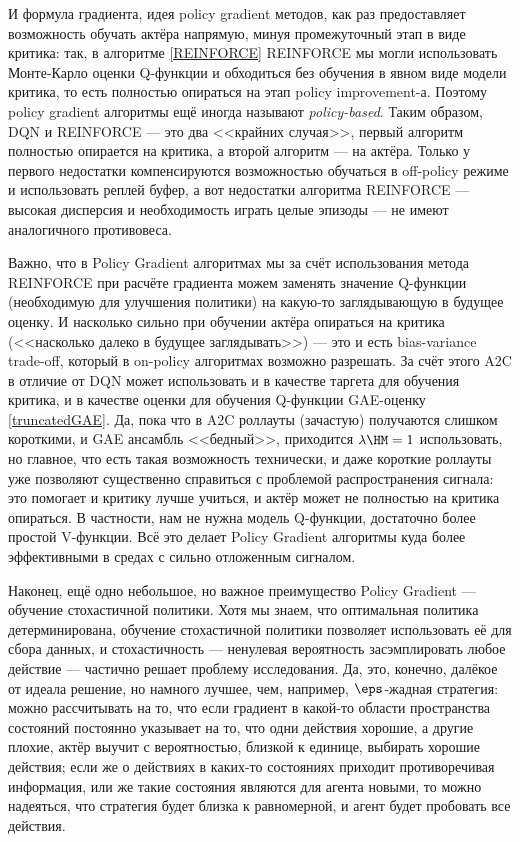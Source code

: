 И формула градиента, идея policy gradient методов, как раз предоставляет возможность обучать актёра напрямую, минуя промежуточный этап в виде критика: так, в алгоритме \ref{REINFORCE} REINFORCE мы могли использовать Монте-Карло оценки Q-функции и обходиться без обучения в явном виде модели критика, то есть полностью опираться на этап policy improvement-а. Поэтому policy gradient алгоритмы ещё иногда называют \emph{policy-based}. Таким образом, DQN и REINFORCE --- это два <<крайних случая>>, первый алгоритм полностью опирается на критика, а второй алгоритм --- на актёра. Только у первого недостатки компенсируются возможностью обучаться в off-policy режиме и использовать реплей буфер, а вот недостатки алгоритма REINFORCE --- высокая дисперсия и необходимость играть целые эпизоды --- не имеют аналогичного противовеса. 

Важно, что в Policy Gradient алгоритмах мы за счёт использования метода REINFORCE при расчёте градиента можем заменять значение Q-функции (необходимую для улучшения политики) на какую-то заглядывающую в будущее оценку. И насколько сильно при обучении актёра опираться на критика (<<насколько далеко в будущее заглядывать>>) --- это и есть bias-variance trade-off, который в on-policy алгоритмах возможно разрешать. За счёт этого A2C в отличие от DQN может использовать и в качестве таргета для обучения критика, и в качестве оценки для обучения Q-функции GAE-оценку \eqref{truncatedGAE}. Да, пока что в A2C роллауты (зачастую) получаются слишком короткими, и GAE ансамбль <<бедный>>, приходится $\lambda \HM= 1$ использовать, но главное, что есть такая возможность технически, и даже короткие роллауты уже позволяют существенно справиться с проблемой распространения сигнала: это помогает и критику лучше учиться, и актёр может не полностью на критика опираться. В частности, нам не нужна модель Q-функции, достаточно более простой V-функции. Всё это делает Policy Gradient алгоритмы куда более эффективными в средах с сильно отложенным сигналом.

Наконец, ещё одно небольшое, но важное преимущество Policy Gradient --- обучение стохастичной политики. Хотя мы знаем, что оптимальная политика детерминирована, обучение стохастичной политики позволяет использовать её для сбора данных, и стохастичность --- ненулевая вероятность засэмплировать любое действие --- частично решает проблему исследования. Да, это, конечно, далёкое от идеала решение, но намного лучшее, чем, например, $\eps$-жадная стратегия: можно рассчитывать на то, что если градиент в какой-то области пространства состояний постоянно указывает на то, что одни действия хорошие, а другие плохие, актёр выучит с вероятностью, близкой к единице, выбирать хорошие действия; если же о действиях в каких-то состояниях приходит противоречивая информация, или же такие состояния являются для агента новыми, то можно надеяться, что стратегия будет близка к равномерной, и агент будет пробовать все действия.

